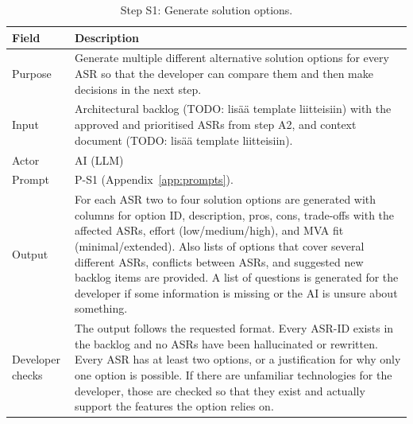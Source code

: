 \begin{table}[!htb]
	\caption{Step S1: Generate solution options.}
	\label{tab:step_S1}
	\begin{tabularx}{\textwidth}{l X}
		\toprule
		\textbf{Field}      & \textbf{Description}                                                                                                                                                                                                                            \\
		\midrule
		Purpose             & Generate multiple different alternative solution options for every ASR so that the developer can compare them and then  make decisions in the next step.                                                                                                                                                   \\
		Input               & Architectural backlog (TODO: lisää template liitteisiin) with the approved and prioritised ASRs from step A2, and context document (TODO: lisää template liitteisiin).                                                    \\
		Actor               & AI (LLM)                                                                                                                                                                                                                                       \\
    Prompt              & P-S1 (Appendix~\ref{app:prompts}).                                                                                                                                                             \\
		Output              & For each ASR two to four solution options are generated with columns for option ID, description, pros, cons, trade-offs with the affected ASRs, effort (low/medium/high), and MVA fit (minimal/extended). Also lists of options that cover several different ASRs, conflicts between ASRs, and suggested new backlog items are provided. A list of questions is generated for the developer if some information is missing or the AI is unsure about something.                                                                                                                 \\
		Developer checks    & The output follows the requested format. Every ASR-ID exists in the backlog and no ASRs have been hallucinated or rewritten. Every ASR has at least two options, or a justification for why only one option is possible. If there are unfamiliar technologies for the developer, those are checked so that they exist and actually support the features the option relies on. \\

\end{tabularx}
\end{table}
